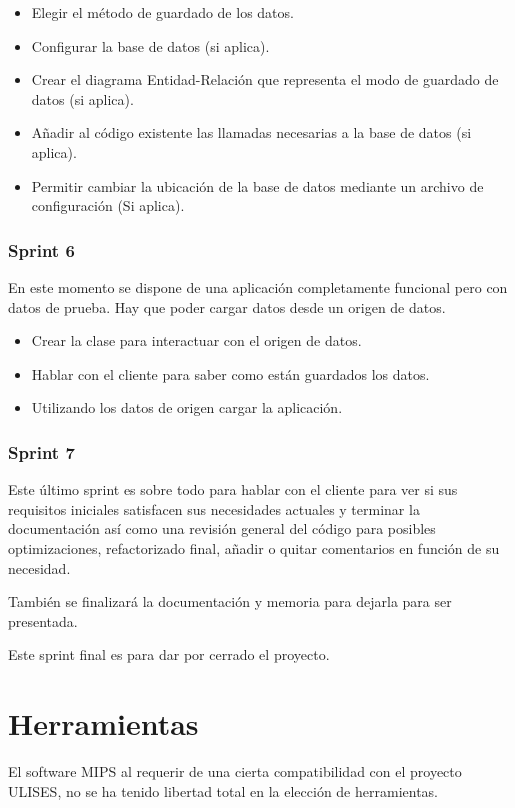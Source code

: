 \begin{itemize}
    \item Elegir el m\'etodo de guardado de los datos.
    \item Configurar la base de datos (si aplica).
    \item Crear el diagrama Entidad-Relaci\'{o}n que representa el modo de guardado de datos 
    (si aplica).
    \item A\~{n}adir al c\'{o}digo existente las llamadas necesarias a la base de datos (si 
    aplica).
    \item Permitir cambiar la ubicaci\'{o}n de la base de datos mediante un archivo de 
    configuraci\'{o}n (Si aplica).
\end{itemize}

\subsubsection{Sprint 6}
En este momento se dispone de una aplicaci\'{o}n completamente funcional pero con datos de 
prueba. 
Hay que poder cargar datos desde un origen de datos.

\begin{itemize}
    \item Crear la clase para interactuar con el origen de datos.
    \item Hablar con el cliente para saber como est\'{a}n guardados los datos.
    \item Utilizando los datos de origen cargar la aplicaci\'{o}n.
\end{itemize}

\subsubsection{Sprint 7}
Este \'ultimo sprint es sobre todo para hablar con el cliente para
ver si sus requisitos iniciales satisfacen sus necesidades actuales
y terminar la documentaci\'on as\'i como una revisi\'on general del c\'odigo
para posibles optimizaciones, refactorizado final, a\~nadir o quitar comentarios
en funci\'on de su necesidad.

Tambi\'en se finalizar\'a la documentaci\'on y memoria para dejarla para ser presentada.

Este sprint final es para dar por cerrado el proyecto.

\section{Herramientas}
El software MIPS al requerir de una cierta compatibilidad con el proyecto
ULISES, no se ha tenido libertad total en la 
elecci\'on de herramientas. 

